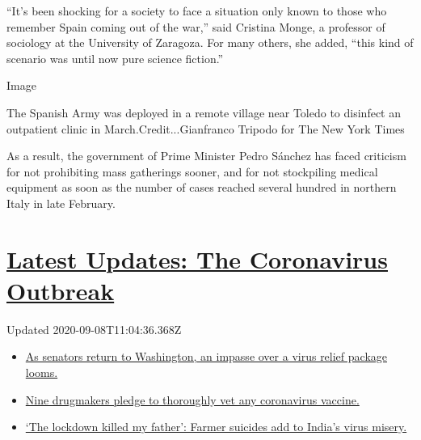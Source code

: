 ``It's been shocking for a society to face a situation only known to
those who remember Spain coming out of the war,'' said Cristina Monge, a
professor of sociology at the University of Zaragoza. For many others,
she added, ``this kind of scenario was until now pure science fiction.''

Image

The Spanish Army was deployed in a remote village near Toledo to
disinfect an outpatient clinic in March.Credit...Gianfranco Tripodo for
The New York Times

As a result, the government of Prime Minister Pedro Sánchez has faced
criticism for not prohibiting mass gatherings sooner, and for not
stockpiling medical equipment as soon as the number of cases reached
several hundred in northern Italy in late February.

\hypertarget{latest-updates-the-coronavirus-outbreak}{%
\section{\texorpdfstring{\href{https://www.nytimes3xbfgragh.onion/2020/09/08/world/covid-19-coronavirus.html?action=click\&pgtype=Article\&state=default\&region=MAIN_CONTENT_1\&context=storylines_live_updates}{Latest
Updates: The Coronavirus
Outbreak}}{Latest Updates: The Coronavirus Outbreak}}\label{latest-updates-the-coronavirus-outbreak}}

Updated 2020-09-08T11:04:36.368Z

\begin{itemize}
\tightlist
\item
  \href{https://www.nytimes3xbfgragh.onion/2020/09/08/world/covid-19-coronavirus.html?action=click\&pgtype=Article\&state=default\&region=MAIN_CONTENT_1\&context=storylines_live_updates\#link-4a77847f}{As
  senators return to Washington, an impasse over a virus relief package
  looms.}
\item
  \href{https://www.nytimes3xbfgragh.onion/2020/09/08/world/covid-19-coronavirus.html?action=click\&pgtype=Article\&state=default\&region=MAIN_CONTENT_1\&context=storylines_live_updates\#link-679303d7}{Nine
  drugmakers pledge to thoroughly vet any coronavirus vaccine.}
\item
  \href{https://www.nytimes3xbfgragh.onion/2020/09/08/world/covid-19-coronavirus.html?action=click\&pgtype=Article\&state=default\&region=MAIN_CONTENT_1\&context=storylines_live_updates\#link-1c973131}{`The
  lockdown killed my father': Farmer suicides add to India's virus
  misery.}
\end{itemize}

